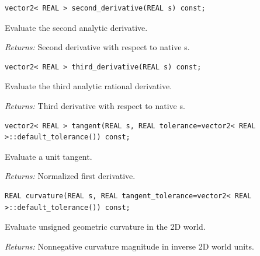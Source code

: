 \par\noindent\begin{minipage}{\linewidth}
\begin{lstlisting}[style=apireference]
vector2< REAL > second_derivative(REAL s) const;
\end{lstlisting}
{\footnotesize Evaluate the second analytic derivative.\par}
{\footnotesize\textit{Returns:} Second derivative with respect to native s.\par}
\end{minipage}\par\vspace{1pt}
\par\noindent\begin{minipage}{\linewidth}
\begin{lstlisting}[style=apireference]
vector2< REAL > third_derivative(REAL s) const;
\end{lstlisting}
{\footnotesize Evaluate the third analytic rational derivative.\par}
{\footnotesize\textit{Returns:} Third derivative with respect to native s.\par}
\end{minipage}\par\vspace{1pt}
\par\noindent\begin{minipage}{\linewidth}
\begin{lstlisting}[style=apireference]
vector2< REAL > tangent(REAL s, REAL tolerance=vector2< REAL >::default_tolerance()) const;
\end{lstlisting}
{\footnotesize Evaluate a unit tangent.\par}
{\footnotesize\textit{Returns:} Normalized first derivative.\par}
\end{minipage}\par\vspace{1pt}
\par\noindent\begin{minipage}{\linewidth}
\begin{lstlisting}[style=apireference]
REAL curvature(REAL s, REAL tangent_tolerance=vector2< REAL >::default_tolerance()) const;
\end{lstlisting}
{\footnotesize Evaluate unsigned geometric curvature in the 2D world.\par}
{\footnotesize\textit{Returns:} Nonnegative curvature magnitude in inverse 2D world units.\par}
\end{minipage}\par\vspace{1pt}
